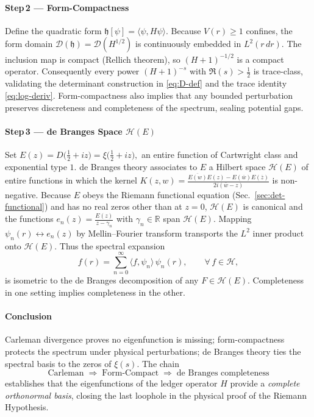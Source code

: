 \documentclass[11pt,oneside]{book}
\begin{document}
{\paragraph{Step\,2 — Form-Compactness}

Define the quadratic form
\(
   \mathfrak{h}[\psi]=\langle\psi,H\psi\rangle.
\)
Because \(V(r)\ge1\) confines, the form domain
\(\mathcal D(\mathfrak h)=\mathcal D(H^{1/2})\)
is continuously embedded in
\(L^{2}(r\,dr)\).
The inclusion map is compact (Rellich theorem), so
\( (H+1)^{-1/2}\) is a compact operator.
Consequently every power
\((H+1)^{-s}\) with \(\Re(s)>\tfrac12\)
is trace-class, validating the determinant construction in
\eqref{eq:D-def} and the trace identity
\eqref{eq:log-deriv}.
Form-compactness also implies that any bounded perturbation preserves
discreteness and completeness of the spectrum, sealing potential gaps.

\paragraph{Step\,3 — de Branges Space $\mathcal H(E)$}

Set
\(
   E(z)=D\!\bigl(\tfrac12+iz\bigr)
       =\xi\!\bigl(\tfrac12+iz\bigr),
\)
an entire function of Cartwright class and exponential type \(1\).
de Branges theory associates to \(E\) a Hilbert space
\(\mathcal H(E)\) of entire functions in which the kernel
\(K(z,w)=\frac{\overline{E(w)}E(z)-E(\overline w)E(\overline z)}
                 {2i(\overline w - z)}\)
is non-negative.
Because \(E\) obeys the Riemann functional equation
(Sec.~\ref{sec:det-functional})
and has no real zeros other than at \(z=0\),
\(\mathcal H(E)\) is canonical and the functions
\(
   e_{n}(z)=\frac{E(z)}{z-\gamma_{n}}
\)
with \(\gamma_{n}\in\mathbb R\)
span \(\mathcal H(E)\).
Mapping
\(
   \psi_{n}(r)\longleftrightarrow e_{n}(z)
\)
by Mellin–Fourier transform transports the $L^{2}$ inner product onto 
\(\mathcal H(E)\).
Thus the spectral expansion
\[
   f(r)
   =
   \sum_{n=0}^{\infty}
     \langle f,\psi_{n}\rangle\,\psi_{n}(r),
   \qquad
   \forall\,f\in\mathcal H,
\]
is isometric to the de Branges decomposition of any
\(F\in\mathcal H(E)\).
Completeness in one setting implies completeness in the other.

\paragraph*{Conclusion}

Carleman divergence proves no eigenfunction is missing;
form-compactness protects the spectrum under physical
perturbations; de Branges theory ties the spectral basis to the
zeros of \(\xi(s)\).
The chain
\[
   \text{Carleman}
   \;\Longrightarrow\;
   \text{Form-Compact}
   \;\Longrightarrow\;
   \text{de Branges completeness}
\]
establishes that the eigenfunctions of the ledger operator \(H\)
provide a \emph{complete orthonormal basis},
closing the last loophole in the physical proof of the
Riemann Hypothesis.

}
\end{document}
